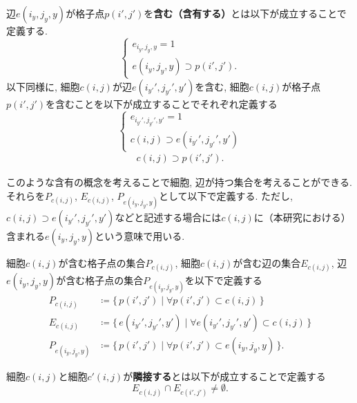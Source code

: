 \begin{definition}[含有]\label{definition:Contain}
  辺$e(i_y,j_y,y)$が格子点$p(i',j')$を\textbf{含む（含有する）}とは以下が成立することで定義する.
  \begin{equation}
    \begin{cases}
      {e_{i_y,j_y,y}=1               } \\
      {e(i_y,j_y,y)\supset p(i',j')}.
    \end{cases}
  \end{equation}
  以下同様に, 細胞$c(i,j)$が辺$e(i_{y'}',j_{y'}',y')$を含む, 細胞$c(i,j)$が格子点$p(i',j')$を含むことを以下が成立することでそれぞれ定義する
  \begin{equation}
    \begin{cases}
      {e_{i_{y'}',j_{y'}',y'}=1 } \\
      {c(i,j)\supset e(i_{y'}',j_{y'}',y')}
    \end{cases}
  \end{equation}
  \begin{align}
    c(i,j)\supset p(i',j').
  \end{align}
\end{definition}
このような含有の概念を考えることで細胞, 辺が持つ集合を考えることができる. それらを$P_{c(i,j)}$, $E_{c(i,j)}$, $P_{e(i_y,j_y,y)}$として以下で定義する. ただし, $c(i,j)\supset e(i_{y'}',j_{y'}',y')$などと記述する場合には$c(i,j)$に（本研究における）含まれる$e(i_y,j_y,y)$という意味で用いる.
\begin{definition}[$P_{c(i,j)}$, $E_{c(i,j)}$, $P_{e(i_y,j_y,y)}$]
  細胞$c(i,j)$が含む格子点の集合$P_{c(i,j)}$, 細胞$c(i,j)$が含む辺の集合$E_{c(i,j)}$, 辺$e(i_y,j_y,y)$が含む格子点の集合$P_{e(i_y,j_y,y)}$を以下で定義する
  \begin{align}
    P_{c(i,j)}       & \coloneqq \{\,p(i',j') \mid \forall p(i',j') \subset c(i,j)\,\}                           \\
    E_{c(i,j)}       & \coloneqq \{\,e(i_{y'}',j_{y'}',y') \mid \forall e(i_{y'}',j_{y'}',y') \subset c(i,j)\,\} \\
    P_{e(i_y,j_y,y)} & \coloneqq \{\,p(i',j') \mid \forall p(i',j') \subset e(i_y,j_y,y)\,\}.
  \end{align}
\end{definition}


\begin{definition}[隣接]\label{definition:Adjacent}
  細胞$c(i,j)$と細胞$c'(i,j)$が\textbf{隣接する}とは以下が成立することで定義する
  \begin{equation}
    E_{c(i,j)} \cap E_{c(i',j')} \neq \emptyset.
  \end{equation}
\end{definition}


